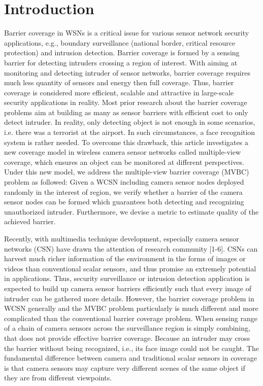 \documentclass[3p]{elsarticle}
\begin{document}
\section{Introduction}
\label{sec:intro}
Barrier coverage in WSNs is a critical issue for various sensor network security applications, e.g., boundary surveillance (national border, critical resource protection) and intrusion detection. Barrier coverage is formed by a sensing barrier for detecting intruders crossing a region of interest. With aiming at monitoring and detecting intruder of sensor networks, barrier coverage requires much less quantity of sensors and energy then full coverage. Thus, barrier coverage is considered more efficient, scalable and attractive in large-scale security applications in reality. Most prior research about the barrier coverage problems aim at building as many as sensor barriers with efficient cost to only detect intruder. In reality, only detecting object is not enough in some scenarios, i.e. there was a terrorist at the airport. In such circumstances, a face recognition system is rather needed. To overcome this drawback, this article investigates a new coverage model in wireless camera sensor networks called multiple-view coverage, which ensures an object can be monitored at different perspectives. Under this new model, we address the multiple-view barrier coverage (MVBC) problem as followed: Given a WCSN including camera sensor nodes deployed randomly in the interest of region, we verify whether a barrier of the camera sensor nodes can be formed which guarantees both detecting and recognizing unauthorized intruder. Furthermore, we devise a metric to estimate quality of the achieved barrier. \par
Recently, with multimedia technique development, especially camera sensor networks (CSN) have drawn the attention of research community [1-6]. CSNs can harvest much richer information of the environment in the forms of images or videos than conventional scalar sensors, and thus promise an extremely potential in applications. Thus, security surveillance or intrusion detection application is expected to build up camera sensor barriers efficiently such that every image of intruder can be gathered more details. However, the barrier coverage problem in WCSN generally and the MVBC problem particularly is much different and more complicated than the conventional barrier coverage problem. When sensing range of a chain of camera sensors across the surveillance region is simply combining, that does not provide effective barrier coverage. Because an intruder may cross the barrier without being recognized, i.e., its face image could not be caught. The  fundamental difference between camera and traditional scalar sensors in coverage is that camera sensors may capture very different scenes of the same object if they are from different viewpoints. 
\end{document}
